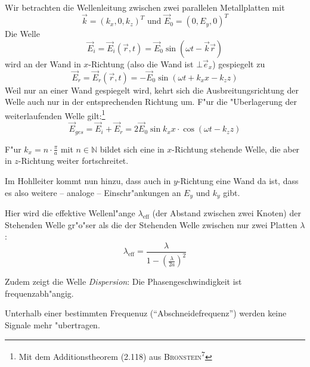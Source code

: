 Wir betrachten die Wellenleitung zwischen zwei parallelen
Metallplatten mit
\begin{equation*}
   \label{eq:422}
   \vec k = (k_x, 0, k_z)^T \text{ und } \vec E_0 = (0, E_y, 0)^T
\end{equation*}
Die Welle
\begin{equation*}
   \vec E_i = \vec E_i(\vec r,t) = \vec E_0 \sin(\omega t - \vec k
   \vec r)
\end{equation*}
wird an der Wand in $x$-Richtung (also die Wand ist $\bot \vec e_x$)
gespiegelt zu
\begin{equation*}
   \vec E_r = \vec E_r(\vec r,t) = - \vec E_0 \sin (\omega t + k_x x -
   k_z z)
\end{equation*}
Weil nur an einer Wand gespiegelt wird, kehrt sich die
Ausbreitungsrichtung der Welle auch nur in der entsprechenden Richtung
um. F"ur die "Uberlagerung der weiterlaufenden Welle
gilt:\footnote{Mit dem Additionstheorem (2.118) aus
  \textsc{Bronstein}\textsuperscript{7}}
\begin{equation}
   \label{eq:423}
   \vec E_{ges} = \vec E_i + \vec E_r = 2 \vec E_0 \sin k_x x \cdot
   \cos ( \omega t - k_z z )
\end{equation}

F"ur $k_x = n\cdot \frac{\pi}{a}$ mit $n \in \mathbb N$ bildet sich
eine in $x$-Richtung stehende Welle, die aber in $z$-Richtung weiter
fortschreitet.

Im Hohlleiter kommt nun hinzu, dass auch in $y$-Richtung eine Wand da
ist, dass es also  weitere -- analoge -- Einschr"ankungen an $E_y$
und $k_y$ gibt.

Hier wird die effektive Wellenl"ange $\lambda_\text{eff}$ (der Abstand
zwischen zwei Knoten) der Stehenden Welle gr"o"ser als die der Stehenden
Welle zwischen nur zwei Platten $\lambda$:
\begin{equation}
   \label{eq:424}
   \lambda_\text{eff} = \frac{\lambda}{1 - \left (\frac{\lambda}{2a} \right)^2}
\end{equation}

Zudem zeigt die Welle \emph{Dispersion}: Die
Phasengeschwindigkeit ist frequenzabh"angig.

Unterhalb einer bestimmten Frequenuz
("`Abschneidefrequenz"') werden keine
Signale mehr "ubertragen.





























